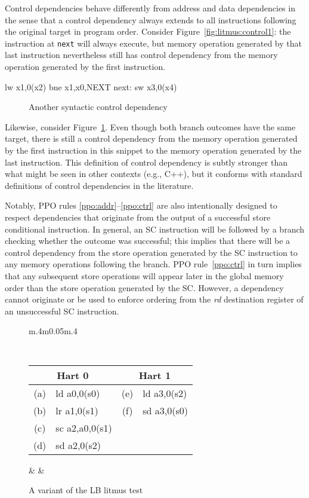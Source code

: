 Control dependencies behave differently from address and data dependencies in the sense that a control dependency always extends to all instructions following the original target in program order.
Consider Figure~\ref{fig:litmus:control1}: the instruction at {\tt next} will always execute, but memory operation generated by that last instruction nevertheless still has control dependency from the memory operation generated by the first instruction.

\begin{verbbox}
        lw  x1,0(x2)
        bne x1,x0,NEXT
  next: sw  x3,0(x4)
\end{verbbox}
\begin{figure}[h!]
  \centering\small
  \theverbbox
  \caption{Another syntactic control dependency}
  \label{fig:litmus:control2}
\end{figure}

Likewise, consider Figure~\ref{fig:litmus:control2}.
Even though both branch outcomes have the same target, there is still a control dependency from the memory operation generated by the first instruction in this snippet to the memory operation generated by the last instruction.
This definition of control dependency is subtly stronger than what might be seen in other contexts (e.g., C++), but it conforms with standard definitions of control dependencies in the literature.

Notably, PPO rules \ref{ppo:addr}--\ref{ppo:ctrl} are also intentionally designed to respect dependencies that originate from the output of a successful store conditional instruction.
In general, an SC instruction will be followed by a branch checking whether the outcome was successful; this implies that there will be a control dependency from the store operation generated by the SC instruction to any memory operations following the branch.
PPO rule~\ref{ppo:ctrl} in turn implies that any subsequent store operations will appear later in the global memory order than the store operation generated by the SC.
However, a dependency cannot originate or be used to enforce ordering from the {\em rd} destination register of an unsuccessful SC instruction.

\begin{figure}[h!]
  \centering
  \begin{tabular}{m{.4\linewidth}m{0.05\linewidth}m{.4\linewidth}}
  {
    \tt\small
    \begin{tabular}{cl||cl}
    \multicolumn{2}{c}{Hart 0} & \multicolumn{2}{c}{Hart 1} \\
    \hline
      (a) & ld a0,0(s0)    & (e) & ld a3,0(s2) \\
      (b) & lr a1,0(s1)    & (f) & sd a3,0(s0) \\
      (c) & sc a2,a0,0(s1) &                    \\
      (d) & sd a2,0(s2)    &                    \\
    \end{tabular}
  }
  & &
  
  \end{tabular}
  \caption{A variant of the LB litmus test}
  \label{fig:litmus:successdeps}
\end{figure}


